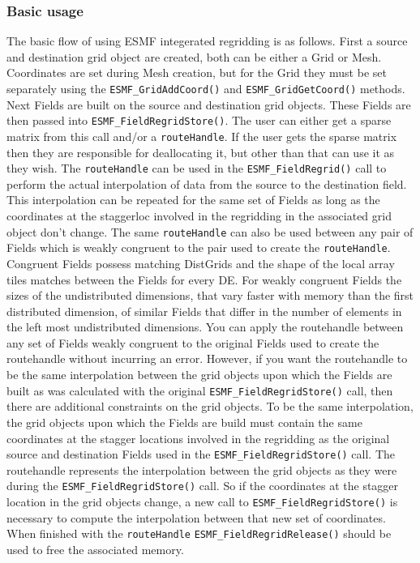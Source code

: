 \subsubsection{Basic usage}
 The basic flow of using ESMF integerated regridding is as follows. First a source and destination grid object are created, both can be either a Grid or Mesh. 
 Coordinates are set during Mesh creation, but for the Grid they must be set separately using the {\tt ESMF\_GridAddCoord()} and {\tt ESMF\_GridGetCoord()} methods. 
 Next Fields are built on the source and destination grid objects. These Fields are then passed into {\tt ESMF\_FieldRegridStore()}. The user can either get a 
 sparse matrix from this call and/or a {\tt routeHandle}. If the user gets the sparse matrix then they are responsible for deallocating it, but other than that
 can use it as they wish. The {\tt routeHandle} can be used in the {\tt ESMF\_FieldRegrid()} call to perform the actual interpolation of data from the source 
 to the destination field. This interpolation can be repeated for the same set of Fields as long as the coordinates at the staggerloc involved in the
 regridding in the associated grid object don't change. The same {\tt routeHandle} can also be used between any pair of Fields which is weakly congruent 
to the pair used to create the {\tt routeHandle}.  Congruent Fields possess matching DistGrids and the shape of the 
local array tiles matches between the Fields for every DE. For weakly congruent Fields the sizes 
of the undistributed dimensions, that vary faster with memory than the first distributed dimension,
 of similar Fields that differ in the number of elements in the left most undistributed dimensions.             
 You can apply the routehandle between any set of Fields weakly congruent to the original Fields used to create the routehandle without 
 incurring an error. However, if you want the routehandle to be the same interpolation between the grid objects upon which the Fields are built as was calculated with the original {\tt ESMF\_FieldRegridStore()} call, then there
 are additional constraints on the grid objects. To be the same interpolation, the grid objects upon which the 
 Fields are build must contain the same coordinates at the stagger locations involved in the regridding as
 the original source and destination Fields used in the {\tt ESMF\_FieldRegridStore()} call.                                               The routehandle represents the interpolation between the grid objects as they were during the {\tt ESMF\_FieldRegridStore()} call.        So if the coordinates at the stagger location in the grid objects change, a new call to {\tt ESMF\_FieldRegridStore()}                    is necessary to compute the interpolation between that new set of coordinates. When finished with the {\tt routeHandle} 
 {\tt ESMF\_FieldRegridRelease()} should be used to free the associated memory. 


